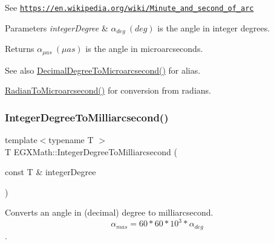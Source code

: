 See \href{https://en.wikipedia.org/wiki/Minute_and_second_of_arc}{\tt https\+://en.\+wikipedia.\+org/wiki/\+Minute\+\_\+and\+\_\+second\+\_\+of\+\_\+arc} 
\begin{DoxyParams}{Parameters}
{\em integer\+Degree} & $\alpha_{deg}\ (deg)$ is the angle in integer degrees. \\
\hline
\end{DoxyParams}
\begin{DoxyReturn}{Returns}
$\alpha_{\mu as}\ (\mu as)$ is the angle in microarcseconds. 
\end{DoxyReturn}
\begin{DoxySeeAlso}{See also}
\mbox{\hyperlink{group___e_g_x_math-_angle_conversions-_decimal_degree_ga6fa88456069907fd24716fa575517571}{Decimal\+Degree\+To\+Microarcsecond()}} for alias. 

\mbox{\hyperlink{group___e_g_x_math-_angle_conversions-_radian_ga3a515ca2838a305fa40750763f546a86}{Radian\+To\+Microarcsecond()}} for conversion from radians. 
\end{DoxySeeAlso}
\mbox{\label{group___e_g_x_math-_angle_conversions-_integer_degree_gadc43f22e832cd8fcf16b7bd2269ae348}} 
\subsubsection{\texorpdfstring{Integer\+Degree\+To\+Milliarcsecond()}{IntegerDegreeToMilliarcsecond()}}
{\footnotesize\ttfamily template$<$typename T $>$ \\
T E\+G\+X\+Math\+::\+Integer\+Degree\+To\+Milliarcsecond (\begin{DoxyParamCaption}\item[{const T \&}]{integer\+Degree }\end{DoxyParamCaption})}



Converts an angle in (decimal) degree to milliarcsecond. \[\alpha_{mas}=60 * 60 * 10^3 * \alpha_{deg} \]. 

